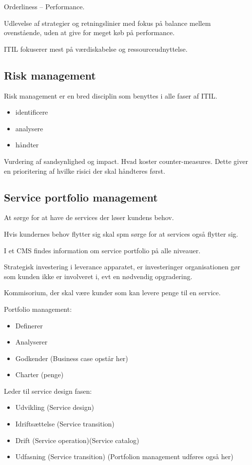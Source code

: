 Orderliness -- Performance.

Udlevelse af strategier og retningslinier med fokus på balance mellem ovenstående, uden at give for meget køb på performance.

ITIL fokuserer mest på værdiskabelse og ressourceudnyttelse.

\subsection{Risk management}
Risk management er en bred disciplin som benyttes i alle faser af ITIL.

\begin{itemize}
\item identificere
\item analysere
\item håndter
\end{itemize}

Vurdering af sandsynlighed og impact. Hvad koster counter-measures. Dette giver en prioritering af hvilke risici der skal håndteres først.

\subsection{Service portfolio management}
At sørge for at have de services der løser kundens behov.

Hvis kundernes behov flytter sig skal spm sørge for at services også flytter sig.

I et CMS findes information om service portfolio på alle niveauer.

Strategisk investering i leverance apparatet, er investeringer organisationen gør som kunden ikke er involveret i, evt en nødvendig opgradering.

Kommisorium, der skal være kunder som kan levere penge til en service.

Portfolio management:
\begin{itemize}
\item Definerer
\item Analyserer
\item Godkender (Business case opstår her)
\item Charter (penge)
\end{itemize}

Leder til service design fasen:
\begin{itemize}
\item Udvikling (Service design)
\item Idriftsættelse (Service transition)
\item Drift (Service operation)(Service catalog)
\item Udfasning (Service transition) (Portfolion management udføres også her)
\end{itemize}

